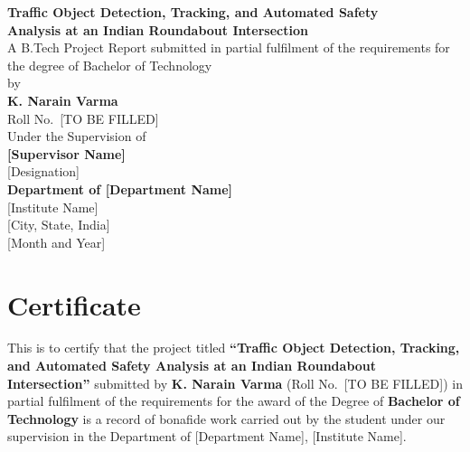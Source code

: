 \documentclass[12pt,a4paper]{report}
\begin{document}
\setcounter{page}{1}
\doublespacing

\begin{titlepage}
\thispagestyle{empty}
\begin{center}
    \vspace*{0.5cm}
    {\Large\bfseries Traffic Object Detection, Tracking, and Automated Safety\\
    Analysis at an Indian Roundabout Intersection}\\[2cm]
    {\large A B.Tech Project Report submitted in partial fulfilment of the requirements
    for the degree of Bachelor of Technology}\\[1.5cm]
    {\large by}\\[0.5cm]
    {\Large\bfseries K. Narain Varma}\\[0.3cm]
    {\large Roll No.\ [TO BE FILLED]}\\[2cm]
    {\large Under the Supervision of}\\[0.5cm]
    {\Large\bfseries [Supervisor Name]}\\[0.3cm]
    {\large [Designation]}\\[2cm]
    \vfill
    {\large\bfseries Department of [Department Name]}\\[0.3cm]
    {\large [Institute Name]}\\[0.5cm]
    {\large [City, State, India]}\\[0.3cm]
    {\large [Month and Year]}
\end{center}
\end{titlepage}
\clearpage\thispagestyle{empty}

\newpage\thispagestyle{empty}
\chapter*{Certificate}
\vspace{1cm}

This is to certify that the project titled \textbf{``Traffic Object Detection, Tracking,
and Automated Safety Analysis at an Indian Roundabout Intersection''} submitted by
\textbf{K. Narain Varma} (Roll No.\ [TO BE FILLED]) in partial fulfilment of the
requirements for the award of the Degree of \textbf{Bachelor of Technology} is a record of
bonafide work carried out by the student under our supervision in the Department of
[Department Name], [Institute Name].
\end{document}
